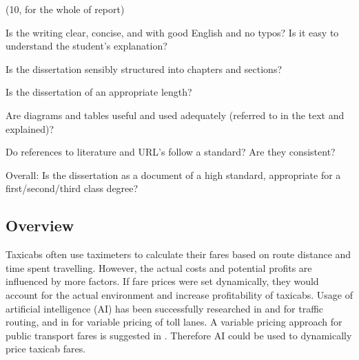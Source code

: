 (10, for the whole of report)

Is the writing clear, concise, and with good English and no typos? Is it easy
to understand the student’s explanation?

Is the dissertation sensibly structured into chapters and sections?

Is the dissertation of an appropriate length?

Are diagrams and tables useful and used adequately (referred to in the text and
explained)?

Do references to literature and URL’s follow a standard? Are they consistent?

Overall: Is the dissertation as a document of a high standard, appropriate for
a first/second/third class degree?

\subsection{Overview}

Taxicabs often use taximeters to calculate their fares based on route distance
and time spent travelling. However, the actual costs and potential profits are
influenced by more factors. If fare prices were set dynamically, they would
account for the actual environment and increase profitability of taxicabs.
Usage of artificial intelligence (AI) has been successfully researched in
\cite{tavares2012reinforcement} and \cite{ben2010road} for traffic routing, and
in \cite{lou2011optimal} for variable pricing of toll lanes. A variable pricing
approach for public transport fares is suggested in \cite{emele2013agent}.
Therefore AI could be used to dynamically price taxicab fares.
